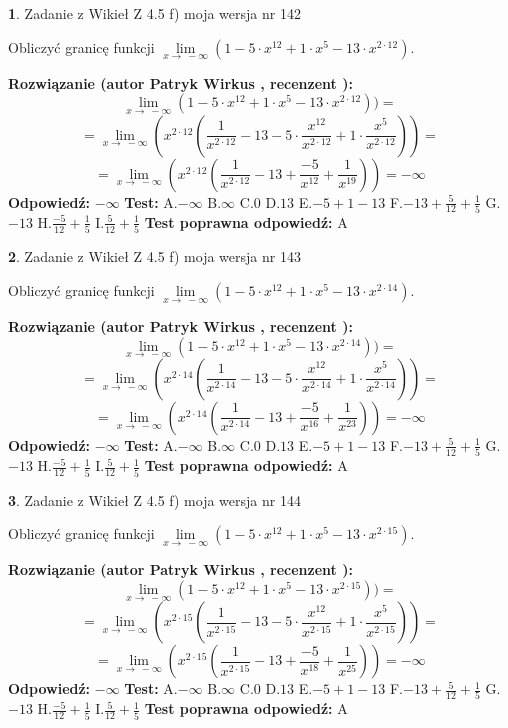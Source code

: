 \documentclass[12pt, a4paper]{article}
\theoremstyle{definition} %
\newtheorem{zad}{}
\newcommand{\zadStart}[1]{\begin{zad}#1\newline}
\newcommand{\zadStop}{\end{zad}}
\newcommand{\rozwStart}[2]{\noindent \textbf{Rozwiązanie (autor #1 , recenzent #2): }\newline}
\newcommand{\rozwStop}{\newline}
\newcommand{\odpStart}{\noindent \textbf{Odpowiedź:}\newline}
\newcommand{\odpStop}{\newline}
\newcommand{\testStart}{\noindent \textbf{Test:}\newline}
\newcommand{\testStop}{\newline}
\newcommand{\kluczStart}{\noindent \textbf{Test poprawna odpowiedź:}\newline}
\newcommand{\kluczStop}{\newline}
\begin{document}
\zadStart{Zadanie z Wikieł Z 4.5 f) moja wersja nr 142}



Obliczyć granicę funkcji  $\lim\limits_{x\to\ -\infty}(1 - 5 \cdot x^{12}+1 \cdot x^{5}- 13 \cdot x^{2\cdot12})$.
\zadStop
\rozwStart{Patryk Wirkus}{}
$$\lim\limits_{x\to\ -\infty}(1 - 5 \cdot x^{12}+1 \cdot x^{5}- 13 \cdot x^{2\cdot12}))=$$
$$=\lim\limits_{x\to\ -\infty}(x^{2\cdot12}(\frac{1}{x^{2\cdot12}}-13 -5 \cdot \frac{x^{12}}{x^{2\cdot12}}+1 \cdot \frac{x^{5}}{x^{2\cdot12}}))=$$
$$=\lim\limits_{x\to\ -\infty}(x^{2\cdot12}(\frac{1}{x^{2\cdot12}}-13 + \frac{-5}{x^{12}}+ \frac{1}{x^{19}}))=-\infty$$
\rozwStop
\odpStart
$-\infty$
\odpStop
\testStart
A.$-\infty$ B.$\infty$ C.$0$ D.$13$ E.$-5 + 1 - 13$
F.$-13+\frac{5}{12}+\frac{1}{5}$ G.$-13$
H.$\frac{-5}{12}+\frac{1}{5}$
I.$\frac{5}{12}+\frac{1}{5}$
\testStop
\kluczStart
A
\kluczStop



\zadStart{Zadanie z Wikieł Z 4.5 f) moja wersja nr 143}



Obliczyć granicę funkcji  $\lim\limits_{x\to\ -\infty}(1 - 5 \cdot x^{12}+1 \cdot x^{5}- 13 \cdot x^{2\cdot14})$.
\zadStop
\rozwStart{Patryk Wirkus}{}
$$\lim\limits_{x\to\ -\infty}(1 - 5 \cdot x^{12}+1 \cdot x^{5}- 13 \cdot x^{2\cdot14}))=$$
$$=\lim\limits_{x\to\ -\infty}(x^{2\cdot14}(\frac{1}{x^{2\cdot14}}-13 -5 \cdot \frac{x^{12}}{x^{2\cdot14}}+1 \cdot \frac{x^{5}}{x^{2\cdot14}}))=$$
$$=\lim\limits_{x\to\ -\infty}(x^{2\cdot14}(\frac{1}{x^{2\cdot14}}-13 + \frac{-5}{x^{16}}+ \frac{1}{x^{23}}))=-\infty$$
\rozwStop
\odpStart
$-\infty$
\odpStop
\testStart
A.$-\infty$ B.$\infty$ C.$0$ D.$13$ E.$-5 + 1 - 13$
F.$-13+\frac{5}{12}+\frac{1}{5}$ G.$-13$
H.$\frac{-5}{12}+\frac{1}{5}$
I.$\frac{5}{12}+\frac{1}{5}$
\testStop
\kluczStart
A
\kluczStop



\zadStart{Zadanie z Wikieł Z 4.5 f) moja wersja nr 144}



Obliczyć granicę funkcji  $\lim\limits_{x\to\ -\infty}(1 - 5 \cdot x^{12}+1 \cdot x^{5}- 13 \cdot x^{2\cdot15})$.
\zadStop
\rozwStart{Patryk Wirkus}{}
$$\lim\limits_{x\to\ -\infty}(1 - 5 \cdot x^{12}+1 \cdot x^{5}- 13 \cdot x^{2\cdot15}))=$$
$$=\lim\limits_{x\to\ -\infty}(x^{2\cdot15}(\frac{1}{x^{2\cdot15}}-13 -5 \cdot \frac{x^{12}}{x^{2\cdot15}}+1 \cdot \frac{x^{5}}{x^{2\cdot15}}))=$$
$$=\lim\limits_{x\to\ -\infty}(x^{2\cdot15}(\frac{1}{x^{2\cdot15}}-13 + \frac{-5}{x^{18}}+ \frac{1}{x^{25}}))=-\infty$$
\rozwStop
\odpStart
$-\infty$
\odpStop
\testStart
A.$-\infty$ B.$\infty$ C.$0$ D.$13$ E.$-5 + 1 - 13$
F.$-13+\frac{5}{12}+\frac{1}{5}$ G.$-13$
H.$\frac{-5}{12}+\frac{1}{5}$
I.$\frac{5}{12}+\frac{1}{5}$
\testStop
\kluczStart
A
\kluczStop
\end{document}
